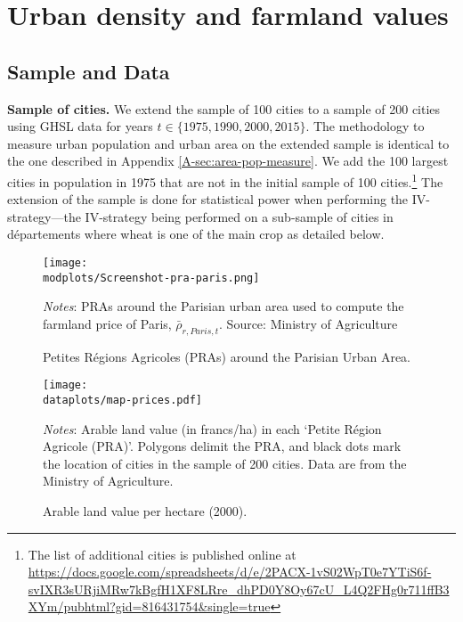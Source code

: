 \documentclass[11pt]{report}
\newcommand{\round}{revision3}  %
\newcommand{\modplots}{../../output/model/plots/\round}
\newcommand{\dataplots}{../../output/data/plots}
\begin{document}
\pagebreak

\section{Urban density and farmland values}\label{A-sec:density-PRAdata}

\subsection{Sample and Data}

\noindent \textbf{Sample of cities.} We extend the sample of 100 cities to a sample of 200 cities using GHSL data for years $t \in \{1975, 1990, 2000, 2015\}$. The methodology to measure urban population and urban area on the extended sample is identical to the one described in Appendix \ref{A-sec:area-pop-measure}. We add the 100 largest cities in population in 1975 that are not in the initial sample of 100 cities.\footnote{The list of additional cities is published online at \url{https://docs.google.com/spreadsheets/d/e/2PACX-1vS02WpT0e7YTiS6f-svIXR3sURjiMRw7kBgfH1XF8LRre_dhPD0Y8Oy67cU_L4Q2FHg0r711ffB3XYm/pubhtml?gid=816431754&single=true}} The extension of the sample is done for statistical power when performing the IV-strategy---the IV-strategy being performed on a sub-sample of cities in départements where wheat is one of the main crop as detailed below. 


\begin{figure}[h!]
	\begin{center}
		\texttt{[image: \\modplots/Screenshot-pra-paris.png]}
		
	\end{center}
	\caption{Petites Régions Agricoles (PRAs) around the Parisian Urban Area.}
	\label{A-fig:PRA_Paris}
	{\footnotesize \textit{Notes}: PRAs around the Parisian urban area used to compute the farmland price of Paris, $\bar{\rho}_{r,Paris,t}$. Source: Ministry of Agriculture}
\end{figure}

\begin{figure}[h!]
	\begin{center}
		\texttt{[image: \\dataplots/map-prices.pdf]}
	\end{center}
	\caption{Arable land value per hectare (2000).}
	\label{A-fig:arablevalue}
	{\footnotesize \textit{Notes}: Arable land value (in francs/ha) in each `Petite Région Agricole (PRA)'. Polygons delimit the PRA, and black dots mark the location of cities in the sample of 200 cities. Data are from the Ministry of Agriculture.}
\end{figure}
\end{document}
